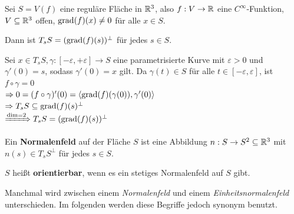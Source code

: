 \begin{bemerkung}%
    Sei $S=V(f)$ eine reguläre Fläche in $\mathbb{R}^3$, also 
    $f:V \rightarrow \mathbb{R}$ eine $C^\infty$-Funktion, $V \subseteq \mathbb{R}^3$
    offen, $\operatorname{grad}(f)(x) \neq 0$ für alle $x \in S$.

    Dann ist $T_s S = (\operatorname{grad}(f)(s))^\perp$ für jedes $s \in S$.
\end{bemerkung}
\begin{beweis}
    Sei $x \in T_s S, \gamma:[-\varepsilon, +\varepsilon] \rightarrow S$
    eine parametrisierte Kurve mit $\varepsilon > 0$ und $\gamma'(0) = s$,
    sodass $\gamma'(0) = x$ gilt. Da $\gamma(t) \in S$ für alle
    $t \in [-\varepsilon, \varepsilon]$, ist $f \circ \gamma = 0$\\
    $\Rightarrow 0 = (f \circ \gamma)'(0) = \langle \operatorname{grad}(f)(\gamma(0)), \gamma'(0) \rangle$\\
    $\Rightarrow T_s S \subseteq \operatorname{grad} (f)(s)^\perp$\\
    $\xRightarrow{\dim = 2} T_s S = (\operatorname{grad}(f)(s))^\perp$
\end{beweis}

\begin{definition}%
    \begin{defenum}
        \item Ein \textbf{Normalenfeld} auf der
              Fläche $S$ ist eine Abbildung $n: S \rightarrow S^2 \subseteq \mathbb{R}^3$
              mit $n(s) \in T_s S^\perp$ für jedes $s \in S$.
        \item $S$ heißt \textbf{orientierbar},
              wenn es ein stetiges Normalenfeld auf $S$ gibt.
    \end{defenum}
\end{definition}

Manchmal wird zwischen einem \textit{Normalenfeld} und einem
\textit{Einheitsnormalenfeld} unterschieden.
Im folgenden werden diese Begriffe jedoch synonym benutzt.

